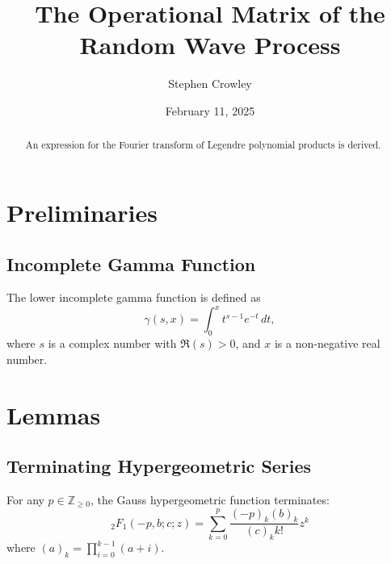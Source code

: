 \documentclass{article}
\title{The Operational Matrix of the Random Wave Process}
\author{
  Stephen Crowley \\
  \tmaffiliation{Department of Intuition \\
  The Royal Citadel of Pure Being\href{mailto:your.email@example.com}{}}
}
\date{February 11, 2025}
\begin{document}
\maketitle

\begin{abstract}
  An expression for the Fourier transform of Legendre polynomial products is derived.
\end{abstract}

\section{Preliminaries}

\subsection{Incomplete Gamma Function}
\begin{definition}
The lower incomplete gamma function is defined as
\[
\gamma(s,x) = \int_0^x t^{s-1} e^{-t} \, dt,
\]
where $s$ is a complex number with $\Re(s) > 0$, and $x$ is a non-negative real number.
\end{definition}

\section{Lemmas}

\subsection{Terminating Hypergeometric Series}
\begin{lemma}
  \label{lem:HyperExpansions}
  For any $p \in \mathbb{Z}_{\geq 0}$, the Gauss hypergeometric function terminates:
  \begin{equation*}
    {}_2 F_1 (- p, b ; c ; z) = \sum_{k = 0}^p \frac{(- p)_k (b)_k}{(c)_k k!}
    z^k
  \end{equation*}
  where $(a)_k = \prod_{i = 0}^{k - 1} (a + i)$.
\end{lemma}
\end{document}
